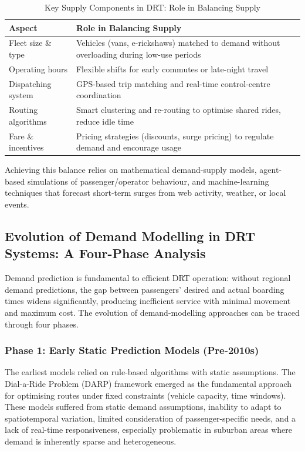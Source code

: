 \documentclass[12pt]{article}
\begin{document}
\begin{table}[H]
\centering
\caption{Key Supply Components in DRT: Role in Balancing Supply}
\label{tab:supply-components}
\small
\begin{tabular}{p{3.5cm}p{10cm}}
\toprule
\textbf{Aspect} & \textbf{Role in Balancing Supply} \\
\midrule
Fleet size \& type & Vehicles (vans, e-rickshaws) matched to demand without overloading during low-use periods \\
Operating hours & Flexible shifts for early commutes or late-night travel \\
Dispatching system & GPS-based trip matching and real-time control-centre coordination \\
Routing algorithms & Smart clustering and re-routing to optimise shared rides, reduce idle time \\
Fare \& incentives & Pricing strategies (discounts, surge pricing) to regulate demand and encourage usage \\
\bottomrule
\end{tabular}
\end{table}

Achieving this balance relies on mathematical demand-supply models, agent-based
simulations of passenger/operator behaviour, and machine-learning techniques that
forecast short-term surges from web activity, weather, or local events.

\subsection{Evolution of Demand Modelling in DRT Systems: A Four-Phase Analysis}

Demand prediction is fundamental to efficient DRT operation: without regional
demand predictions, the gap between passengers' desired and actual boarding times
widens significantly, producing inefficient service with minimal movement and
maximum cost. The evolution of demand-modelling approaches can be traced through
four phases.

\subsubsection{Phase 1: Early Static Prediction Models (Pre-2010s)}
The earliest models relied on rule-based algorithms with static assumptions. The
Dial-a-Ride Problem (DARP) framework emerged as the fundamental approach for
optimising routes under fixed constraints (vehicle capacity, time windows). These
models suffered from static demand assumptions, inability to adapt to
spatiotemporal variation, limited consideration of passenger-specific needs, and a
lack of real-time responsiveness, especially problematic in suburban areas where
demand is inherently sparse and heterogeneous.
\end{document}
